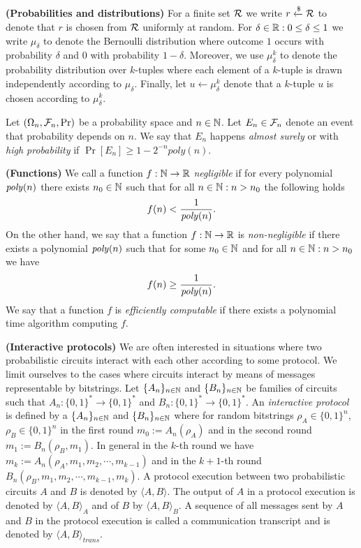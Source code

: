 \textbf{(Probabilities and distributions)}
For a finite set $\mathcal{R}$ we write $r \xleftarrow{\$} \mathcal{R}$ to denote that $r$ is chosen from $\mathcal{R}$ uniformly at random.
For $\delta \in \mathbb{R} : 0 \leq \delta \leq 1$ we write $\mu_{\delta}$ to denote the Bernoulli distribution where outcome $1$ occurs with
probability $\delta$ and $0$ with probability $1-\delta$.
Moreover, we use $\mu_{\delta}^k$ to denote the probability distribution over $k$-tuples
where each element of a $k$-tuple is drawn independently according to $\mu_{\delta}$.
Finally, let $u \leftarrow \mu_{\delta}^k$ denote that a $k$-tuple $u$ is chosen according to $\mu_{\delta}^k$.

Let $(\Omega_n, \mathcal{F}_n, \Pr)$ be a probability space and $n \in \mathbb{N}$.
Let $E_n \in \mathcal{F}_n$ denote an event that probability depends on $n$.
We say that $E_n$ happens \textit{almost surely} or with \textit{high probability} if $\Pr[E_n] \geq 1 - 2^{-n} \mathit{poly}(n)$.

\textbf{(Functions)} We call a function $f: \mathbb{N} \rightarrow \mathbb{R}$ \textit{negligible} if for every polynomial $\operatorname{\mathit{poly}}(n)$
there exists $n_0 \in \mathbb{N}$ such that for all $n \in \mathbb{N} : n > n_0$ the following holds
\begin{align*}
f(n) < \frac{1}{\operatorname{\mathit{poly}}(n)}.
\end{align*}
On the other hand, we say that a function $f: \mathbb{N} \rightarrow \mathbb{R}$ is \textit{non-negligible} if
there exists a polynomial $\operatorname{\mathit{poly}}(n)$ such that for some $n_0 \in \mathbb{N}$ and for all $n \in \mathbb{N} : n > n_0$ we have
\begin{align*}
  f(n) \geq \frac{1}{\operatorname{\mathit{poly}}(n)}.
\end{align*}
We say that a function $f$ is \textit{efficiently computable} if there exists a polynomial time algorithm computing $f$.

\textbf{(Interactive protocols)}
We are often interested in situations where two probabilistic circuits interact with each other according to some protocol.
We limit ourselves to the cases where circuits interact by means of messages representable by bitstrings.
Let $\{A_n\}_{n \in \mathbb{N}}$ and $\{B_n\}_{n \in \mathbb{N}}$ be families of circuits such that $A_n : \{0,1\}^{*} \rightarrow \{0,1\}^{*}$ and $B_n : \{0,1\}^{*} \rightarrow \{0,1\}^{*}$.
An \textit{interactive protocol} is defined by a $\{A_n\}_{n \in \mathbb{N}}$ and $\{B_n\}_{n \in \mathbb{N}}$ where
for random bitstrings $\rho_A \in \{0,1\}^{n}$, $\rho_B \in \{0,1\}^{n}$ in the first round $m_0 := A_n(\rho_A)$ and in the second round $m_1 := B_n(\rho_B, m_1)$.
In general in the $k$-th round we have $m_k := A_n(\rho_A, m_1, m_2, \cdots, m_{k-1})$ and in the $k+1$-th round $B_n(\rho_B, m_1, m_2, \cdots, m_{k-1}, m_{k})$.
A protocol execution between two probabilistic circuits $A$ and $B$ is denoted by $\langle A, B \rangle$.
The output of $A$ in a protocol execution is denoted by $\langle A, B \rangle_A$ and of $B$ by $\langle A, B \rangle_B$.
A sequence of all messages sent by $A$ and $B$ in the protocol execution is called a communication transcript and
is denoted by $\langle A, B \rangle_{\mathit{trans}}$.

